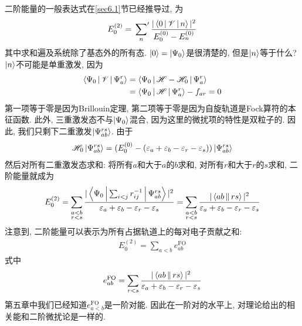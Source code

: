 二阶能量的一般表达式在\ref{sec6.1}节已经推导过, 
为
\begin{align}
E_0^{(2)} = \sideset{}{'}\sum_n\frac{|\Braket{0|\mathscr{V}|n}|^2}{E_0^{(0)} - E_n^{(0)}}
\end{align}
其中求和遍及系统除了基态外的所有态. 
$\Ket{0} = \Ket{\Psi_0}$是很清楚的, 
但是$\Ket{n}$等于什么? $\Ket{n}$不可能是单重激发, 
因为
\begin{align*}
\Braket{\Psi_0|\mathscr{V}|\Psi_a^r} & = \Braket{\Psi_0|\mathscr{H}-\mathscr{H}_0|\Psi_a^r} \\
                             & = \Braket{\Psi_0|\mathscr{H}|\Psi_a^r} - f_{ar} = 0
\end{align*}
第一项等于零是因为Brillouin定理, 
第二项等于零是因为自旋轨道是Fock算符的本征函数. 
此外, 
三重激发态不与$\Ket{\Psi_0}$混合, 
因为这里的微扰项的特性是双粒子的. 
因此, 
我们只剩下二重激发$\Ket{\Psi_{ab}^{rs}}$. 
由于
\begin{align*}
\mathscr{H}_0\Ket{\Psi_{ab}^{rs}} = (E_0^{(0)} - (\varepsilon_a + \varepsilon_b - \varepsilon_r - \varepsilon_s))\Ket{\Psi_{ab}^{rs}}
\end{align*}
然后对所有二重激发态求和: 将所有$a$和大于$a$的$b$求和, 
对所有$r$和大于$r$的$s$求和, 
二阶能量就成为
\begin{align}
E_0^{(2)} = \sum_{\substack{a<b\\r<s}} \frac{|\Braket{\Psi_0|\sum_{i<j} r_{ij}^{-1}|\Psi_{ab}^{rs}}|^2}{\varepsilon_a + \varepsilon_b -\varepsilon_r-\varepsilon_s} = \sum_{\substack{a<b\\r<s}} \frac{|\Braket{ab||rs}|^2}{\varepsilon_a + \varepsilon_b -\varepsilon_r-\varepsilon_s}
\end{align}
注意到, 
二阶能量可以表示为所有占据轨道上的每对电子贡献之和:
\begin{align*}
E_0^{(2)} = \sum_{a<b}e_{ab}^\mathrm{FO}
\end{align*}
式中
\begin{align*}
e_{ab}^{\mathrm{FO}} =  \sum_{r<s} \frac{|\Braket{ab||rs}|^2}{\varepsilon_a + \varepsilon_b -\varepsilon_r-\varepsilon_s}
\end{align*}
第五章中我们已经知道$e_{a<b}^\mathrm{FO}$是一阶对能. 
因此在一阶对的水平上, 
对理论给出的相关能和二阶微扰论是一样的.


